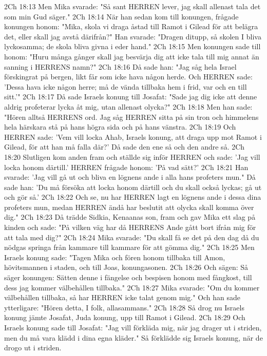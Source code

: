 2Ch 18:13  Men Mika svarade: "Så sant HERREN lever, jag skall allenast tala det som min Gud säger."
2Ch 18:14  När han sedan kom till konungen, frågade konungen honom: "Mika, skola vi draga åstad till Ramot i Gilead för att belägra det, eller skall jag avstå därifrån?" Han svarade: "Dragen ditupp, så skolen I bliva lyckosamma; de skola bliva givna i eder hand."
2Ch 18:15  Men konungen sade till honom: "Huru många gånger skall jag besvärja dig att icke tala till mig annat än sanning i HERRENS namn?"
2Ch 18:16  Då sade han: "Jag såg hela Israel förskingrat på bergen, likt får som icke hava någon herde. Och HERREN sade: 'Dessa hava icke någon herre; må de vända tillbaka hem i frid, var och en till sitt.'"
2Ch 18:17  Då sade Israels konung till Josafat: "Sade jag dig icke att denne aldrig profeterar lycka åt mig, utan allenast olycka?"
2Ch 18:18  Men han sade: "Hören alltså HERRENS ord. Jag såg HERREN sitta på sin tron och himmelens hela härskara stå på hans högra sida och på hans vänstra.
2Ch 18:19  Och HERREN sade: 'Vem vill locka Ahab, Israels konung, att draga upp mot Ramot i Gilead, för att han må falla där?' Då sade den ene så och den andre så.
2Ch 18:20  Slutligen kom anden fram och ställde sig inför HERREN och sade: 'Jag vill locka honom därtill.' HERREN frågade honom: 'På vad sätt?'
2Ch 18:21  Han svarade: 'Jag vill gå ut och bliva en lögnens ande i alla hans profeters mun." Då sade han: 'Du må försöka att locka honom därtill och du skall också lyckas; gå ut och gör så.'
2Ch 18:22  Och se, nu har HERREN lagt en lögnens ande i dessa dina profeters mun, medan HERREN ändå har beslutit att olycka skall komma över dig."
2Ch 18:23  Då trädde Sidkia, Kenaanas son, fram och gav Mika ett slag på kinden och sade: "På vilken väg har då HERRENS Ande gått bort ifrån mig för att tala med dig?"
2Ch 18:24  Mika svarade: "Du skall få se det på den dag då du nödgas springa från kammare till kammare för att gömma dig."
2Ch 18:25  Men Israels konung sade: "Tagen Mika och fören honom tillbaka till Amon, hövitsmannen i staden, och till Joas, konungasonen.
2Ch 18:26  Och sägen: Så säger konungen: Sätten denne i fängelse och bespisen honom med fångkost, till dess jag kommer välbehållen tillbaka."
2Ch 18:27  Mika svarade: "Om du kommer välbehållen tillbaka, så har HERREN icke talat genom mig." Och han sade ytterligare: "Hören detta, I folk, allasammans."
2Ch 18:28  Så drog nu Israels konung jämte Josafat, Juda konung, upp till Ramot i Gilead.
2Ch 18:29  Och Israels konung sade till Josafat: "Jag vill förkläda mig, när jag drager ut i striden, men du må vara klädd i dina egna kläder." Så förklädde sig Israels konung, när de drogo ut i striden.
